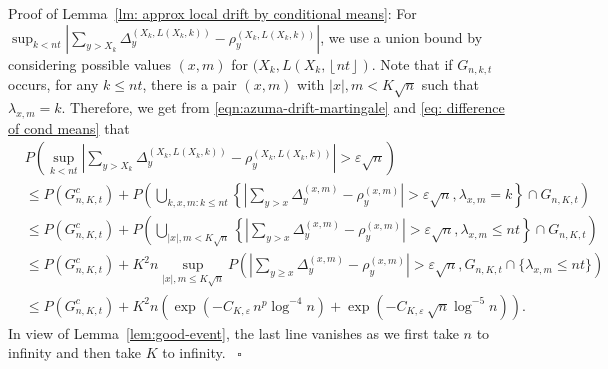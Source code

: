 \documentclass[twoside,12pt,a4paper]{article}
\numberwithin{equation}{section}
\newenvironment{proof}[1][Proof]{{\sc #1}:}{~\hfill $\square$}
\newcommand{\abs}[1]{\left\vert #1 \right\vert}
\begin{document}
\begin{proof}[Proof of Lemma~\ref{lm: approx local drift by conditional means}]
	For $\sup_{k < nt} \left| \sum_{y > X_k} \Delta_y^{\left(X_k,L(X_k, k)\right)} - \rho_y^{\left(X_k,L(X_k, k)\right)} \right|$, we use a union bound by considering possible values $(x,m)$ for $(X_k, L(X_k, \left\lfloor nt  \right\rfloor)$. Note that if $G_{n,k,t}$ occurs, for any $k\leq nt$, there is a pair $(x,m)$ with $\abs{x},m <K\sqrt{n}$ such that $\lambda_{x,m}=k$. Therefore, we get from \eqref{eqn:azuma-drift-martingale} and \eqref{eq: difference of cond means} that 
	\begin{align*}
		& P\left( \sup_{k < nt} \left| \sum_{y > X_k} 
		\Delta_y^{\left(X_k,L(X_k, k)\right)} - \rho_y^{\left(X_k,L(X_k, k)\right)}
		\right| > \varepsilon \sqrt{n}  \right) \\
		&\le P(G_{n, K, t}^c) + P\left( \bigcup_{k,x,m: k \leq nt} \left\{  \left| \sum_{y > x} \Delta_y^{(x,m)} - \rho_y^{(x,m)} \right|  > \varepsilon \sqrt{n}, \lambda_{x,m} =k\right\} \cap G_{n,K,t} \right)
		\\
		&\le P(G_{n, K, t}^c) + P\left( \bigcup_{|x|, m < K \sqrt{n} } \left\{  \left| \sum_{y > x} \Delta_y^{(x,m)} - \rho_y^{(x,m)} \right|  > \varepsilon \sqrt{n},  \lambda_{x,m} \leq nt \right\} \cap G_{n,K,t} \right) \\
		&\le P(G_{n, K, t}^c) + K^2 n \sup _{|x|, m \le  K \sqrt{n} }
		P\left( \left| \sum_{y \ge x} \Delta_y^{(x,m)} - \rho_y^{(x,m)} \right|  > \varepsilon \sqrt{n} , G_{n,K,t}\cap \{\lambda_{x,m} \leq nt \}  \right) \\
		&\le P(G_{n, K, t}^c) + K^2 n \left( \exp\left( - C_{K, \varepsilon} \, n^{p } \log^{-4} n \right) + \exp\left( - C_{K, \varepsilon} \, \sqrt{n}  \log^{-5} n \right)\right) 
		.\end{align*}
	In view of Lemma~\ref{lem:good-event}, the last line vanishes as we first take $n$ to infinity and then take $K$ to infinity.
\end{proof}


\printbibliography
\end{document}
